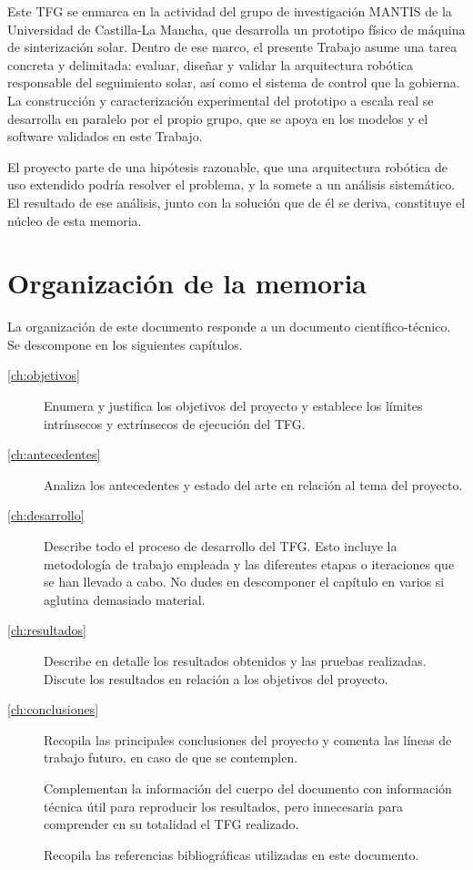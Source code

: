 Este \gls{TFG} se enmarca en la actividad del grupo de investigación MANTIS de la Universidad de Castilla-La Mancha, que desarrolla un prototipo físico de máquina de sinterización solar. Dentro de ese marco, el presente Trabajo asume una tarea concreta y delimitada: evaluar, diseñar y validar la arquitectura robótica responsable del seguimiento solar, así como el sistema de control que la gobierna. La construcción y caracterización experimental del prototipo a escala real se desarrolla en paralelo por el propio grupo, que se apoya en los modelos y el software validados en este Trabajo.

El proyecto parte de una hipótesis razonable, que una arquitectura robótica de uso extendido podría resolver el problema, y la somete a un análisis sistemático. El resultado de ese análisis, junto con la solución que de él se deriva, constituye el núcleo de esta memoria.


\section{Organización de la memoria} 
\label{sec:organizacion-memoria}

La organización de este documento responde a un documento científico-técnico. Se descompone en los siguientes capítulos.

\begin{description}
    \item[\autoref{ch:objetivos}] Enumera y justifica los objetivos del proyecto y establece los límites intrínsecos y extrínsecos de ejecución del TFG.
    \item[\autoref{ch:antecedentes}] Analiza los antecedentes y estado del arte en relación al tema del proyecto.
    \item[\autoref{ch:desarrollo}] Describe todo el proceso de desarrollo del TFG.  Esto incluye la metodología de trabajo empleada y las diferentes etapas o iteraciones que se han llevado a cabo.  No dudes en descomponer el capítulo en varios si aglutina demasiado material.
    \item[\autoref{ch:resultados}] Describe en detalle los resultados obtenidos y las pruebas realizadas. Discute los resultados en relación a los objetivos del proyecto.
    \item[\autoref{ch:conclusiones}] Recopila las principales conclusiones del proyecto y comenta las líneas de trabajo futuro, en caso de que se contemplen.
    \item[] Complementan la información del cuerpo del documento con información técnica útil para reproducir los resultados, pero innecesaria para comprender en su totalidad el TFG realizado.
    \item[] Recopila las referencias bibliográficas utilizadas en este documento.
\end{description}




